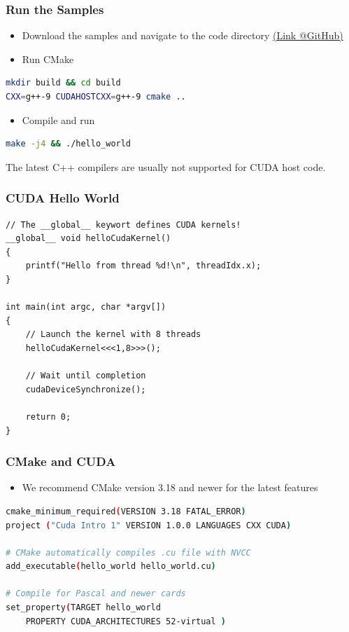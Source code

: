 \documentclass[aspectratio=169]{beamer}
\begin{document}
\begin{frame}[fragile]
\frametitle{Run the Samples}
\begin{itemize}
	\item Download the samples and navigate to the code directory \href{https://github.com/darglein/saiga/tree/master/samples/cuda/helloCuda}{(Link @GitHub)}
	\item Run CMake 
\end{itemize}
\begin{lstlisting}[language=bash]
mkdir build && cd build
CXX=g++-9 CUDAHOSTCXX=g++-9 cmake ..
\end{lstlisting}
\begin{itemize}
	\item Compile and run
\end{itemize}
\begin{lstlisting}[language=bash]
make -j4 && ./hello_world
\end{lstlisting}

\begin{mdframed}[frametitle=Note:]
	The latest C++ compilers are usually not supported for CUDA host code.
\end{mdframed}
	
\end{frame}

\begin{frame}[fragile]
\frametitle{CUDA Hello World}
\begin{lstlisting}
// The __global__ keywort defines CUDA kernels!
__global__ void helloCudaKernel()
{
	printf("Hello from thread %d!\n", threadIdx.x);
}

int main(int argc, char *argv[])
{
	// Launch the kernel with 8 threads
	helloCudaKernel<<<1,8>>>();
	
	// Wait until completion
	cudaDeviceSynchronize();
	
	return 0;
}
\end{lstlisting}
\end{frame}

\begin{frame}[fragile]
\frametitle{CMake and CUDA}
	\begin{itemize}
	\item We recommend CMake version 3.18 and newer for the latest features

		\end{itemize}
\begin{lstlisting}[language=bash]
cmake_minimum_required(VERSION 3.18 FATAL_ERROR)
project ("Cuda Intro 1" VERSION 1.0.0 LANGUAGES CXX CUDA)

# CMake automatically compiles .cu file with NVCC
add_executable(hello_world hello_world.cu)

# Compile for Pascal and newer cards
set_property(TARGET hello_world 
	PROPERTY CUDA_ARCHITECTURES 52-virtual )
\end{lstlisting}
\end{frame}
\end{document}
